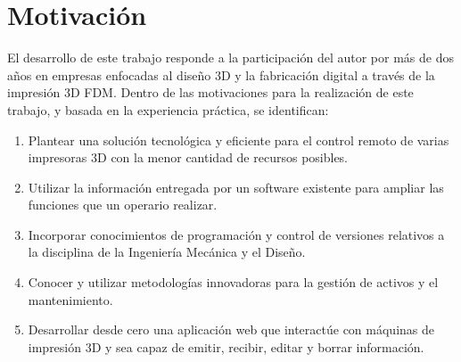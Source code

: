 \clearpage

\section{Motivación}

El desarrollo de este trabajo responde a la participación del autor por más de dos años en empresas enfocadas al diseño 3D y la fabricación digital a través de la impresión 3D FDM. Dentro de las motivaciones para la realización de este trabajo, y basada en la experiencia práctica, se identifican:

\begin{enumerate}
	\item Plantear una solución tecnológica y eficiente para el control remoto de varias impresoras 3D con la menor cantidad de recursos posibles.
	\item Utilizar la información entregada por un software existente para ampliar las funciones que un operario realizar.
	\item Incorporar conocimientos de programación y control de versiones relativos a la disciplina de la Ingeniería Mecánica y el Diseño.
	\item Conocer y utilizar metodologías innovadoras para la gestión de activos y el mantenimiento.
	\item Desarrollar desde cero una aplicación web que interactúe con máquinas de impresión 3D y sea capaz de emitir, recibir, editar y borrar información.   
\end{enumerate} 





